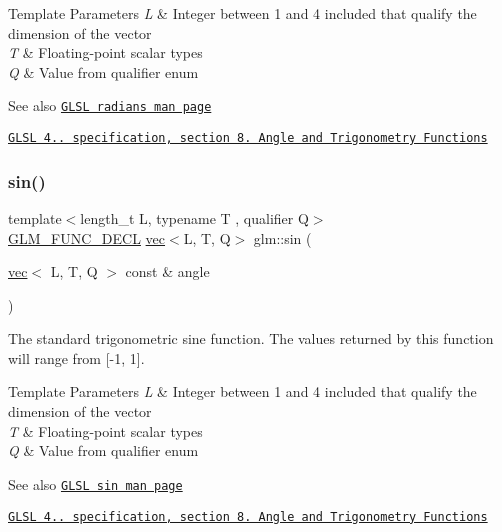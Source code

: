 \begin{DoxyTemplParams}{Template Parameters}
{\em L} & Integer between 1 and 4 included that qualify the dimension of the vector \\
\hline
{\em T} & Floating-\/point scalar types \\
\hline
{\em Q} & Value from qualifier enum\\
\hline
\end{DoxyTemplParams}
\begin{DoxySeeAlso}{See also}
\href{http://www.opengl.org/sdk/docs/manglsl/xhtml/radians.xml}{\tt G\+L\+SL radians man page} 

\href{http://www.opengl.org/registry/doc/GLSLangSpec.4.20.8.pdf}{\tt G\+L\+SL 4.. specification, section 8. Angle and Trigonometry Functions} 
\end{DoxySeeAlso}
\mbox{\label{group__core__func__trigonometric_ga29747fd108cb7292ae5a284f69691a69}} 
\subsubsection{\texorpdfstring{sin()}{sin()}}
{\footnotesize\ttfamily template$<$length\+\_\+t L, typename T , qualifier Q$>$ \\
\mbox{\hyperlink{setup_8hpp_ab2d052de21a70539923e9bcbf6e83a51}{G\+L\+M\+\_\+\+F\+U\+N\+C\+\_\+\+D\+E\+CL}} \mbox{\hyperlink{structglm_1_1vec}{vec}}$<$L, T, Q$>$ glm\+::sin (\begin{DoxyParamCaption}\item[{\mbox{\hyperlink{structglm_1_1vec}{vec}}$<$ L, T, Q $>$ const \&}]{angle }\end{DoxyParamCaption})}

The standard trigonometric sine function. The values returned by this function will range from \mbox{[}-\/1, 1\mbox{]}.


\begin{DoxyTemplParams}{Template Parameters}
{\em L} & Integer between 1 and 4 included that qualify the dimension of the vector \\
\hline
{\em T} & Floating-\/point scalar types \\
\hline
{\em Q} & Value from qualifier enum\\
\hline
\end{DoxyTemplParams}
\begin{DoxySeeAlso}{See also}
\href{http://www.opengl.org/sdk/docs/manglsl/xhtml/sin.xml}{\tt G\+L\+SL sin man page} 

\href{http://www.opengl.org/registry/doc/GLSLangSpec.4.20.8.pdf}{\tt G\+L\+SL 4.. specification, section 8. Angle and Trigonometry Functions} 
\end{DoxySeeAlso}
\mbox{\label{group__core__func__trigonometric_gac7c39ff21809e281552b4dbe46f4a39d}} 
